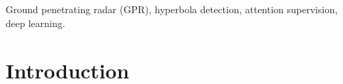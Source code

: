 \documentclass[lettersize,journal]{IEEEtran}
\begin{document}
\begin{IEEEkeywords}
Ground penetrating radar (GPR), hyperbola detection, attention supervision, deep learning.
\end{IEEEkeywords}

\section{Introduction}





\end{document}
